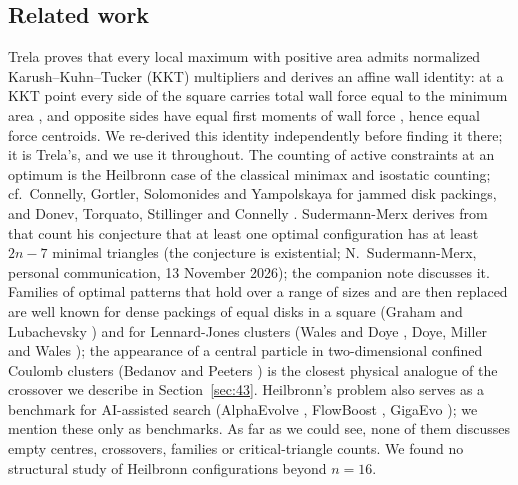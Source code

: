 \documentclass[11pt]{amsart}
\theoremstyle{definition}
\begin{document}
\subsection*{Related work}
Trela \cite[Thm.~2.3]{Trela} proves that every local maximum with positive area admits normalized Karush--Kuhn--Tucker (KKT) multipliers and derives an affine wall identity: at a KKT point every side of the square carries total wall force equal to the minimum area \cite[eq.~(17)]{Trela}, and opposite sides have equal first moments of wall force \cite[eq.~(18)]{Trela}, hence equal force centroids. %
We re-derived this identity independently before finding it there; it is Trela's, and we use it throughout.
The counting of active constraints at an optimum is the Heilbronn case of the classical minimax and isostatic counting; cf.\ Connelly, Gortler, Solomonides and Yampolskaya \cite{CGSY} for jammed disk packings, and Donev, Torquato, Stillinger and Connelly \cite{DTSC}. %
Sudermann-Merx derives from that count his conjecture that at least one optimal configuration has at least $2n-7$ minimal triangles \cite[Conj.~1]{SM} (the conjecture is existential; N.~Sudermann-Merx, personal communication, 13 November 2026); the companion note \cite{Note2} discusses it.
Families of optimal patterns that hold over a range of sizes and are then replaced are well known for dense packings of equal disks in a square (Graham and Lubachevsky \cite{GL}) and for Lennard-Jones clusters (Wales and Doye \cite{WD}, Doye, Miller and Wales \cite{DMW}); the appearance of a central particle in two-dimensional confined Coulomb clusters (Bedanov and Peeters \cite{BP}) is the closest physical analogue of the crossover we describe in Section~\ref{sec:43}. %
Heilbronn's problem also serves as a benchmark for AI-assisted search (AlphaEvolve \cite{AlphaEvolve}, FlowBoost \cite{FlowBoost}, GigaEvo \cite{GigaEvo}); we mention these only as benchmarks. As far as we could see, none of them discusses empty centres, crossovers, families or critical-triangle counts. %
We found no structural study of Heilbronn configurations beyond $n = 16$. %
\end{document}
